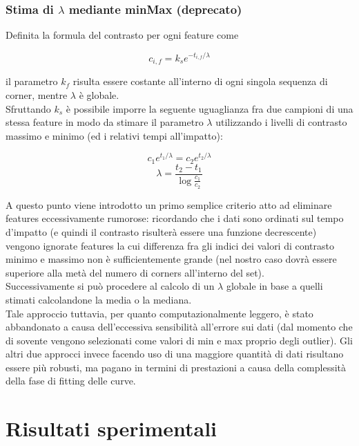 \documentclass[12pt]{report}
\begin{document}
\subsection{Stima di $\lambda$ mediante minMax (deprecato)}

\noindent Definita la formula del contrasto per ogni feature come

$$ c_{i,f} = k_se^{-t_{i,f}/\lambda} $$

\noindent il parametro $k_f$ risulta essere costante all'interno di ogni singola sequenza di corner, mentre $\lambda$ \`e globale.\\
\noindent Sfruttando $k_s$ \`e possibile imporre la seguente uguaglianza fra due campioni di una stessa feature in modo da stimare il parametro $\lambda$ utilizzando i livelli di contrasto massimo e minimo (ed i relativi tempi all'impatto):

$$ c_1e^{t_1/\lambda} = c_2e^{t_2/\lambda} $$
$$ \lambda = \frac{t_2-t_1}{\log\frac{c_1}{c_2}} $$

\noindent A questo punto viene introdotto un primo semplice criterio atto ad eliminare features eccessivamente rumorose: ricordando che i dati sono ordinati sul tempo d'impatto (e quindi il contrasto risulter\`a essere una funzione decrescente) vengono ignorate features la cui differenza fra gli indici dei valori di contrasto minimo e massimo non \`e sufficientemente grande (nel nostro caso dovr\`a essere superiore alla met\`a del numero di corners all'interno del set).\\

\noindent Successivamente si pu\`o procedere al calcolo di un $\lambda$ globale in base a quelli stimati calcolandone la media o la mediana.\\

\noindent Tale approccio tuttavia, per quanto computazionalmente leggero, \`e stato abbandonato a causa dell'eccessiva sensibilit\`a all'errore sui dati (dal momento che di sovente vengono selezionati come valori di min e max proprio degli outlier). Gli altri due approcci invece facendo uso di una maggiore quantit\`a di dati risultano essere pi\`u robusti, ma pagano in termini di prestazioni a causa della complessit\`a della fase di fitting delle curve.




\chapter{Risultati sperimentali}
\end{document}
